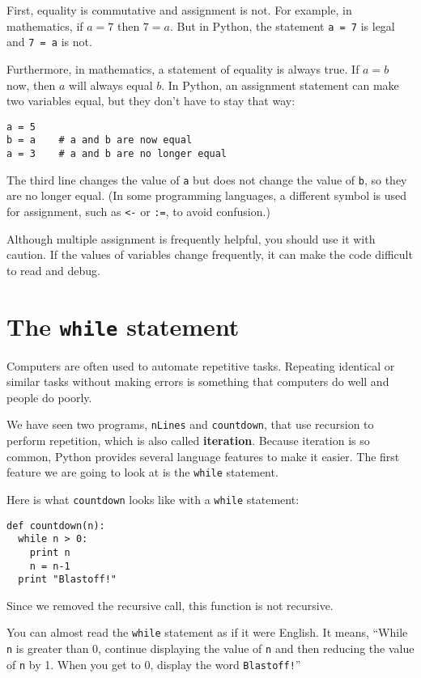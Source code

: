 First, equality is commutative and assignment is not.  For
example, in mathematics, if $a = 7$ then $7 = a$.  But in Python, the
statement {\tt a = 7} is legal and {\tt 7 = a} is not.

Furthermore, in mathematics, a statement of equality is always true.
If $a = b$ now, then $a$ will always equal $b$.  In Python, an
assignment statement can make two variables equal, but they don't have
to stay that way:

\beforeverb
\begin{verbatim}
a = 5
b = a    # a and b are now equal
a = 3    # a and b are no longer equal
\end{verbatim}
\afterverb
%
The third line changes the value of {\tt a} but does not change the
value of {\tt b}, so they are no longer equal. (In some
programming languages, a different symbol is used for assignment,
such as {\tt <-} or {\tt :=}, to avoid confusion.)

Although multiple assignment is frequently helpful, you should use it
with caution.  If the values of variables change frequently, it can
make the code difficult to read and debug.


\section{The {\tt while} statement}

Computers are often used to automate repetitive tasks.  Repeating
identical or similar tasks without making errors is something that
computers do well and people do poorly.

We have seen two programs, {\tt nLines} and {\tt countdown}, that use
recursion to perform repetition, which is also called {\bf iteration}.
Because iteration is so common, Python provides several language
features to make it easier.  The first feature we are going to look
at is the {\tt while} statement.

Here is what {\tt countdown} looks like with a 
{\tt while} statement:

\beforeverb
\begin{verbatim}
def countdown(n):
  while n > 0:
    print n
    n = n-1
  print "Blastoff!"
\end{verbatim}
\afterverb
%
Since we removed the recursive call, this function is not
recursive.

You can almost read the {\tt while} statement as if it were English.
It means, ``While {\tt n} is greater than 0, continue
displaying the value of {\tt n} and then reducing the value of
{\tt n} by 1.  When you get to 0, display the word {\tt Blastoff!}''

